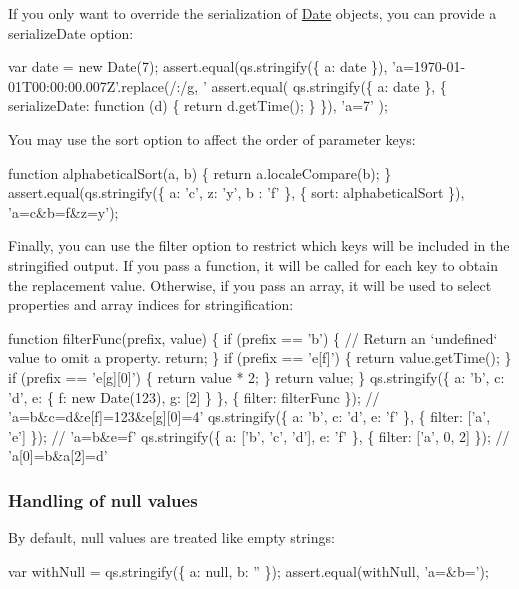 If you only want to override the serialization of {\ttfamily \mbox{\hyperlink{classDate}{Date}}} objects, you can provide a {\ttfamily serialize\+Date} option\+:


\begin{DoxyCode}
var date = new Date(7);
assert.equal(qs.stringify(\{ a: date \}), 'a=1970-01-01T00:00:00.007Z'.replace(/:/g, '%
assert.equal(
    qs.stringify(\{ a: date \}, \{ serializeDate: function (d) \{ return d.getTime(); \} \}),
    'a=7'
);
\end{DoxyCode}


You may use the {\ttfamily sort} option to affect the order of parameter keys\+:


\begin{DoxyCode}
function alphabeticalSort(a, b) \{
    return a.localeCompare(b);
\}
assert.equal(qs.stringify(\{ a: 'c', z: 'y', b : 'f' \}, \{ sort: alphabeticalSort \}), 'a=c&b=f&z=y');
\end{DoxyCode}


Finally, you can use the {\ttfamily filter} option to restrict which keys will be included in the stringified output. If you pass a function, it will be called for each key to obtain the replacement value. Otherwise, if you pass an array, it will be used to select properties and array indices for stringification\+:


\begin{DoxyCode}
function filterFunc(prefix, value) \{
    if (prefix == 'b') \{
        // Return an `undefined` value to omit a property.
        return;
    \}
    if (prefix == 'e[f]') \{
        return value.getTime();
    \}
    if (prefix == 'e[g][0]') \{
        return value * 2;
    \}
    return value;
\}
qs.stringify(\{ a: 'b', c: 'd', e: \{ f: new Date(123), g: [2] \} \}, \{ filter: filterFunc \});
// 'a=b&c=d&e[f]=123&e[g][0]=4'
qs.stringify(\{ a: 'b', c: 'd', e: 'f' \}, \{ filter: ['a', 'e'] \});
// 'a=b&e=f'
qs.stringify(\{ a: ['b', 'c', 'd'], e: 'f' \}, \{ filter: ['a', 0, 2] \});
// 'a[0]=b&a[2]=d'
\end{DoxyCode}


\subsubsection*{Handling of {\ttfamily null} values}

By default, {\ttfamily null} values are treated like empty strings\+:


\begin{DoxyCode}
var withNull = qs.stringify(\{ a: null, b: '' \});
assert.equal(withNull, 'a=&b=');
\end{DoxyCode}


